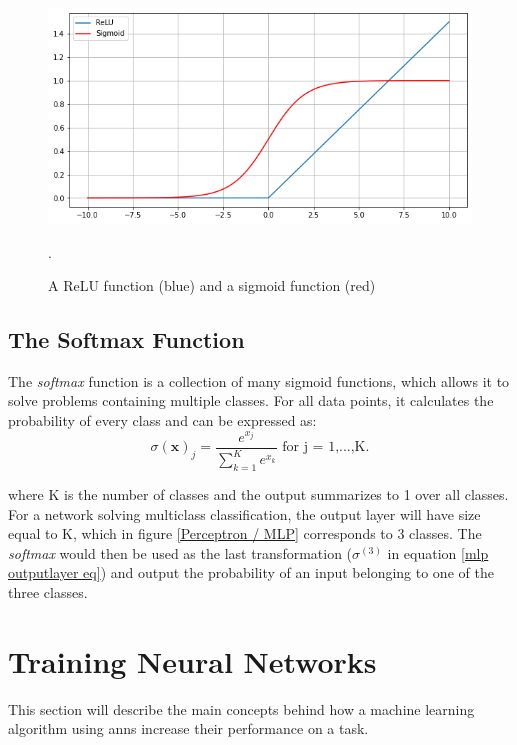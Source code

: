             \begin{figure}[H]
                \centering
                \includegraphics[scale=0.5]{figures/activation.png}
                \caption[ReLu and sigmoid]{A ReLU function (blue) and a sigmoid function (red)}.
              	\medskip 
                \label{activation_fig}
            \end{figure}
            
            
    \subsection{The Softmax Function}
        The \textit{softmax} function is a collection of many sigmoid functions, which allows it to solve problems containing multiple classes\cite{sharma2019new_activation_func}. For all data points, it calculates the probability of every class and can be expressed as:
        \begin{equation}
            \sigma(\textbf{x})_{j} = \dfrac{e^{x_{j}}}{\sum^{K}_{k=1}e^{x_{k}}} \textrm{ for j = 1,...,K.}
        \end{equation}
        
        where K is the number of classes and the output summarizes to 1 over all classes. For a network solving multiclass classification, the output layer will have size equal to K, which in figure \ref{Perceptron / MLP} corresponds to 3 classes. The \textit{softmax} would then be used as the last transformation ($\sigma^{(3)}$ in equation \ref{mlp outputlayer eq}) and output the probability of an input belonging to one of the three classes.

\section{Training Neural Networks} \label{training neural networks}
    This section will describe the main concepts behind how a machine learning algorithm using \gls{ann}s increase their performance on a task. 

